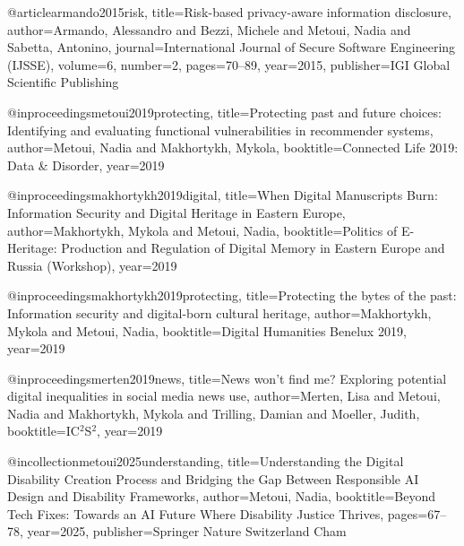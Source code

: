 @article{armando2015risk,
  title={Risk-based privacy-aware information disclosure},
  author={Armando, Alessandro and Bezzi, Michele and Metoui, Nadia and Sabetta, Antonino},
  journal={International Journal of Secure Software Engineering (IJSSE)},
  volume={6},
  number={2},
  pages={70--89},
  year={2015},
  publisher={IGI Global Scientific Publishing}
}

@inproceedings{metoui2019protecting,
  title={Protecting past and future choices: Identifying and evaluating functional vulnerabilities in recommender systems},
  author={Metoui, Nadia and Makhortykh, Mykola},
  booktitle={Connected Life 2019: Data \& Disorder},
  year={2019}
}

@inproceedings{makhortykh2019digital,
  title={When Digital Manuscripts Burn: Information Security and Digital Heritage in Eastern Europe},
  author={Makhortykh, Mykola and Metoui, Nadia},
  booktitle={Politics of E-Heritage: Production and Regulation of Digital Memory in Eastern Europe and Russia (Workshop)},
  year={2019}
}

@inproceedings{makhortykh2019protecting,
  title={Protecting the bytes of the past: Information security and digital-born cultural heritage},
  author={Makhortykh, Mykola and Metoui, Nadia},
  booktitle={Digital Humanities Benelux 2019},
  year={2019}
}

@inproceedings{merten2019news,
  title={News won’t find me? Exploring potential digital inequalities in social media news use},
  author={Merten, Lisa and Metoui, Nadia and Makhortykh, Mykola and Trilling, Damian and Moeller, Judith},
  booktitle={IC$^2$S$^2$},
  year={2019}
}

@incollection{metoui2025understanding,
  title={Understanding the Digital Disability Creation Process and Bridging the Gap Between Responsible AI Design and Disability Frameworks},
  author={Metoui, Nadia},
  booktitle={Beyond Tech Fixes: Towards an AI Future Where Disability Justice Thrives},
  pages={67--78},
  year={2025},
  publisher={Springer Nature Switzerland Cham}
}
